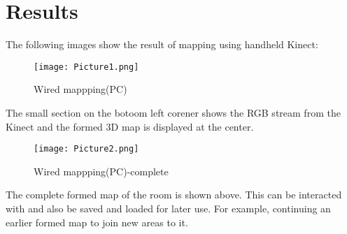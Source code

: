 \chapter{Results}
The following images show the result of mapping using handheld Kinect:

\begin{figure}[ht]
\begin{center}

\texttt{[image: Picture1.png]}

\caption{Wired mappping(PC)}

\label{fig:map1}
\end{center}
\end{figure}

\par The small section on the botoom left corener shows the RGB stream from the Kinect and the formed 3D map is displayed at the center.

\newpage 

\begin{figure}[ht]
\begin{center}

\texttt{[image: Picture2.png]}

\caption{Wired mappping(PC)-complete}

\label{fig:map2}
\end{center}
\end{figure}

\par The complete formed map of the room is shown above. This can be interacted with and also be saved and loaded for later use. For example, continuing an earlier formed map to join new areas to it.


